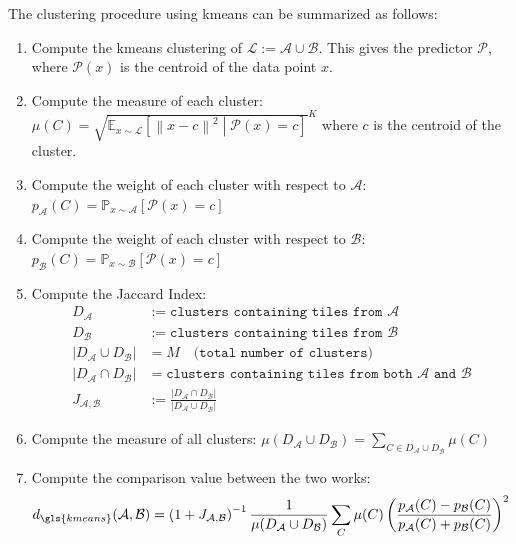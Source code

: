 \begin{modified}
\noindent The clustering procedure using \gls{kmeans} can be summarized as follows:
\begin{enumerate}
	\item Compute the \gls{kmeans} clustering of $\mathcal{L}:=\mathcal{A}\cup\mathcal{B}$. This gives the predictor $\mathcal{P}$, where $\mathcal{P}(x)$ is the centroid of the data point $x$.
	\item Compute the measure of each cluster: $\mu(C)=\sqrt{\mathbb{E}_{x\sim\mathcal{L}}\left[\left\|x-c\right\|^2\middle| \mathcal{P}(x)=c\right]}^K$ where $c$ is the centroid of the cluster.
	\item Compute the weight of each cluster with respect to $\mathcal{A}$: $p_\mathcal{A}(C)=\mathbb{P}_{x\sim\mathcal{A}}\left[\mathcal{P}(x)=c\right]$
	\item Compute the weight of each cluster with respect to $\mathcal{B}$: $p_\mathcal{B}(C)=\mathbb{P}_{x\sim\mathcal{B}}\left[\mathcal{P}(x)=c\right]$
	\item Compute the Jaccard Index:
	\begin{align*}
		D_\mathcal{A} &:= \texttt{clusters containing tiles from $\mathcal{A}$}\\
		D_\mathcal{B} &:= \texttt{clusters containing tiles from $\mathcal{B}$}\\
		\left|D_\mathcal{A}\cup D_\mathcal{B}\right| &= M \quad \texttt{(total number of clusters)} \\
		\left|D_\mathcal{A}\cap D_\mathcal{B}\right| &= \texttt{clusters containing tiles from both $\mathcal{A}$ and $\mathcal{B}$} \\
		J_{\mathcal{A},\mathcal{B}} &:= \frac{\left|D_\mathcal{A}\cap D_\mathcal{B}\right|}{\left|D_\mathcal{A}\cup D_\mathcal{B}\right|}
	\end{align*}
	\item Compute the measure of all clusters: $\mu(D_\mathcal{A}\cup D_\mathcal{B}) = \sum_{C\in D_\mathcal{A}\cup D_\mathcal{B}} \mu(C)$
	\item Compute the comparison value between the two works:
	\[
		d_{\gls{kmeans}}(\mathcal{A},\mathcal{B}) = \left(1+J_{\mathcal{A},\mathcal{B}}\right)^{-1}\frac{1}{\mu(D_\mathcal{A}\cup D_\mathcal{B})}\sum_C \mu(C)\left(\frac{p_\mathcal{A}(C)-p_\mathcal{B}(C)}{p_\mathcal{A}(C)+p_\mathcal{B}(C)}\right)^2
	\]
\end{enumerate}
\end{modified}

